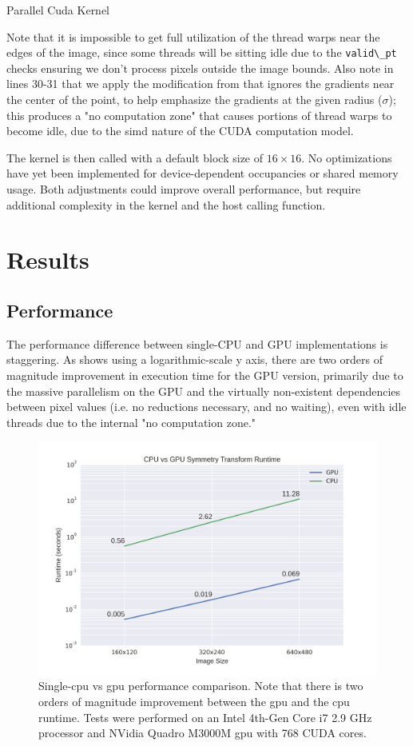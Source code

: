 \begin{algorithm}[ht]
\caption{Parallel Cuda Kernel}\label{alg:kernel}

\end{algorithm}

Note that it is impossible to get full utilization of the thread warps near the edges of the image, since some threads will be sitting idle due to the \texttt{valid\textbackslash{}\_pt} checks ensuring we don't process pixels outside the image bounds. Also note in lines 30-31 that we apply the modification from \cite{kootstra_using_2010} that ignores the gradients near the center of the point, to help emphasize the gradients at the given radius (\(\sigma\)); this produces a "no computation zone" that causes portions of thread warps to become idle, due to the \gls{simd} nature of the CUDA computation model.

The kernel is then called with a default block size of \(16\times16\). No optimizations have yet been implemented for device-dependent occupancies or shared memory usage. Both adjustments could improve overall performance, but require additional complexity in the kernel and the host calling function. 

\section{Results}
\label{sec:results}
\subsection{Performance}
\label{sec:performance}

The performance difference between single-CPU and GPU implementations is staggering. As  shows using a logarithmic-scale y axis, there are two orders of magnitude improvement in execution time for the GPU version, primarily due to the massive parallelism on the GPU and the virtually non-existent dependencies between pixel values (i.e. no reductions necessary, and no waiting), even with idle threads due to the internal "no computation zone." 

\begin{figure}[htbp]
\centering
\includegraphics[width=0.6\linewidth]{figures/cpu_v_gpu.png}
\caption{\label{fig:perf}
Single-\gls{cpu} vs \gls{gpu} performance comparison. Note that there is two orders of magnitude improvement between the \gls{gpu} and the \gls{cpu} runtime. Tests were performed on an Intel 4th-Gen Core i7 2.9 GHz processor and NVidia Quadro M3000M \gls{gpu} with 768 CUDA cores.}
\end{figure}

